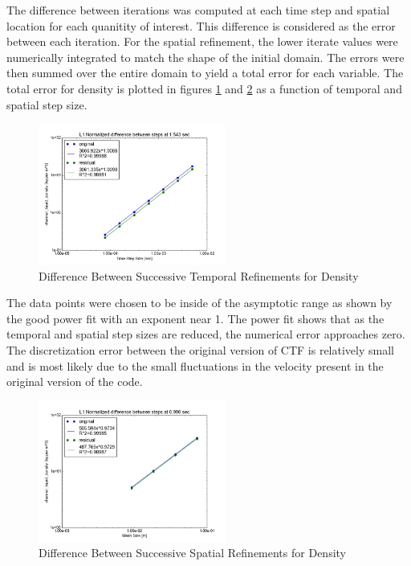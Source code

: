 \documentclass{mc2015}
\begin{document}
The difference between iterations was computed at each time step and spatial
location for each quanitity of interest. This difference is considered as the
error between each iteration. For the spatial refinement, the lower iterate
values were numerically integrated to match the shape of the initial domain. The
errors were then summed over the entire domain to yield a total error for each
variable. The total error for density is plotted in figures
\ref{fig:Temporal:Diff_rho} and \ref{fig:Spatial:Diff_rho} as a function of
temporal and spatial step size.

\begin{figure}[!h]
	\centering
	\includegraphics[width=0.55\textwidth]{images/Temporal_Study/Difference_rho}
	\caption{Difference Between Successive Temporal Refinements for Density}
	\label{fig:Temporal:Diff_rho}
\end{figure} 

The data points were chosen to be inside of the asymptotic range as shown by
the good power fit with an exponent near 1. The power fit shows that as the
temporal and spatial step sizes are reduced, the numerical error approaches
zero. The discretization error between the original version of CTF is
relatively small and is most likely due to the small fluctuations in the
velocity present in the original version of the code. 

\begin{figure}[!h]
	\centering
	\includegraphics[width=0.55\textwidth]{images/Spatial_Study/Difference_rho}
	\caption{Difference Between Successive Spatial Refinements for Density}
	\label{fig:Spatial:Diff_rho}
\end{figure} 
\end{document}
